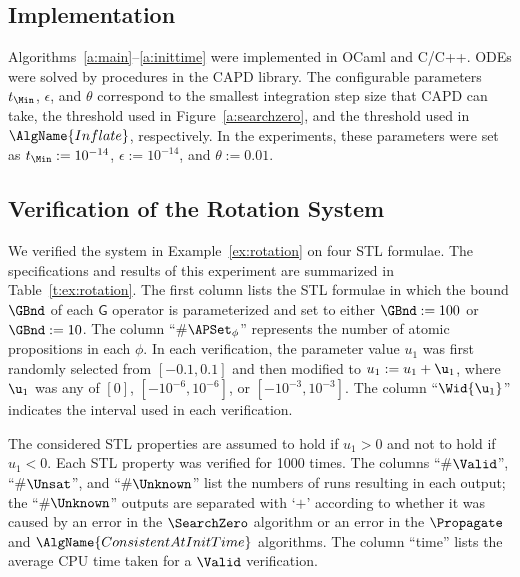 \documentclass[paper]{ieice}
\newcommand{\Always}{\mathsf{G}}
\begin{document}
\subsection{Implementation}
\label{s:impl}

Algorithms~\ref{a:main}--\ref{a:inittime} were implemented in OCaml and C/C++.
ODEs were solved by procedures in the CAPD library.
The configurable parameters $t_\Min$, $\epsilon$, and $\theta$ correspond to the smallest integration step size that CAPD can take, the threshold used in Figure~\ref{a:searchzero}, and the threshold used in $\AlgName{Inflate}$, respectively.
In the experiments, these parameters were set as $t_\Min := 10^{-14}$, $\epsilon := 10^{-14}$, and $\theta := 0.01$.


\subsection{Verification of the Rotation System}



We verified the system in Example~\ref{ex:rotation} on four STL formulae.
The specifications and results of this experiment are summarized in  Table~\ref{t:ex:rotation}.
The first column lists the STL formulae in which the bound $\GBnd$ of each $\Always$ operator is parameterized and set to either $\GBnd:=100$ or $\GBnd:=10$.
The column ``\#$\APSet_\phi$'' represents the number of atomic propositions in each $\phi$.
In each verification, the parameter value $u_1$ was first randomly selected from $[-0.1,0.1]$ and then modified to $u_1 := u_1 + \u_1$, where $\u_1$ was any of $[0]$, $[-10^{-6},10^{-6}]$, or $[-10^{-3},10^{-3}]$.
The column ``$\Wid{\u_1}$'' indicates the interval used in each verification.

The considered STL properties are assumed to hold if $u_1 > 0$ and not to hold if $u_1 < 0$.
Each STL property was verified for 1000 times.
The columns ``\#$\Valid$'', ``\#$\Unsat$'', and ``\#$\Unknown$'' list the numbers of runs resulting in each output; the ``\#$\Unknown$'' outputs are separated with `$+$' according to whether it was caused by an error in the $\SearchZero$ algorithm or an error in the $\Propagate$ and $\AlgName{ConsistentAtInitTime}$ algorithms.
The column ``time'' lists the average CPU time taken for a $\Valid$ verification.
\end{document}

